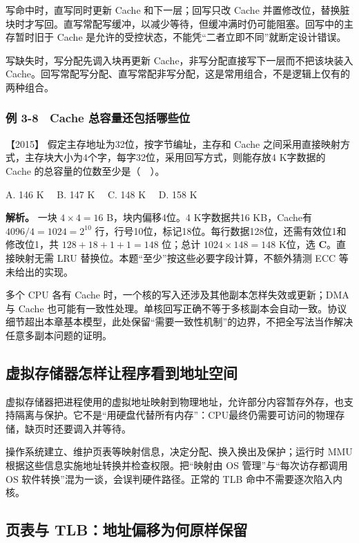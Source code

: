 写命中时，直写同时更新 Cache 和下一层；回写只改 Cache 并置修改位，替换脏块时才写回。直写常配写缓冲，以减少等待，但缓冲满时仍可能阻塞。回写中的主存暂时旧于 Cache 是允许的受控状态，不能凭``二者立即不同''就断定设计错误。

写缺失时，写分配先调入块再更新 Cache，非写分配直接写下一层而不把该块装入 Cache。回写常配写分配、直写常配非写分配，这是常用组合，不是逻辑上仅有的两种组合。

\subsubsection{例 3-8　Cache 总容量还包括哪些位}\label{co-ex3-8}

\noindent{}【2015】 假定主存地址为32位，按字节编址，主存和 Cache 之间采用直接映射方式，主存块大小为4个字，每字32位，采用回写方式，则能存放4 K字数据的 Cache 的总容量的位数至少是（　）。

A. 146 K　 B. 147 K　 C. 148 K　 D. 158 K


\textbf{解析。} 一块 \(4\times4=16\) B，块内偏移4位。4 K字数据共16 KB，Cache有 \(4096/4=1024=2^{10}\) 行，行号10位，标记18位。每行数据128位，还需有效位1和修改位1，共 \(128+18+1+1=148\) 位；总计 \(1024\times148=148\) K位，选 \textbf{C}。直接映射无需 LRU 替换位。本题``至少''按这些必要字段计算，不额外猜测 ECC 等未给出的实现。

多个 CPU 各有 Cache 时，一个核的写入还涉及其他副本怎样失效或更新；DMA 与 Cache 也可能有一致性处理。单核回写正确不等于多核副本会自动一致。协议细节超出本章基本模型，此处保留``需要一致性机制''的边界，不把全写法当作解决任意多副本问题的证明。

\subsection{虚拟存储器怎样让程序看到地址空间}\label{co-03-11}

虚拟存储器把进程使用的虚拟地址映射到物理地址，允许部分内容暂存外存，也支持隔离与保护。它不是``用硬盘代替所有内存''：CPU最终仍需要可访问的物理存储，缺页时还要调入并等待。

操作系统建立、维护页表等映射信息，决定分配、换入换出及保护；运行时 MMU 根据这些信息实施地址转换并检查权限。把``映射由 OS 管理''与``每次访存都调用 OS 软件转换''混为一谈，会误判硬件路径。正常的 TLB 命中不需要逐次陷入内核。

\subsection{页表与 TLB：地址偏移为何原样保留}\label{co-03-12}

